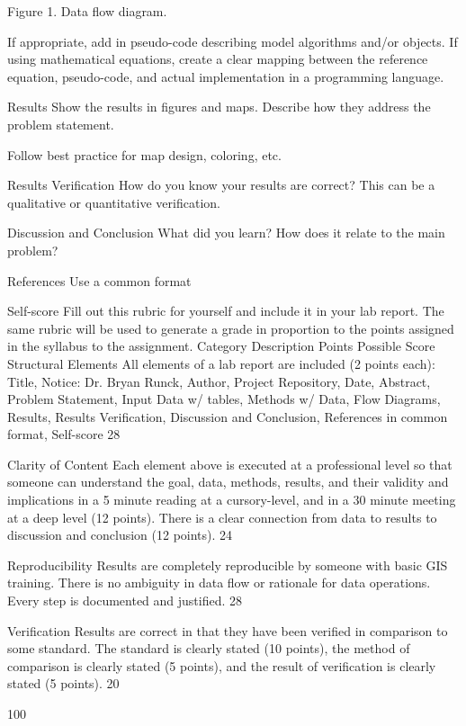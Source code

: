 Figure 1. Data flow diagram. 

If appropriate, add in pseudo-code describing model algorithms and/or objects. If using mathematical equations, create a clear mapping between the reference equation, pseudo-code, and actual implementation in a programming language.

Results
Show the results in figures and maps. Describe how they address the problem statement. 

Follow best practice for map design, coloring, etc.




Results Verification
How do you know your results are correct? This can be a qualitative or quantitative verification.



Discussion and Conclusion
What did you learn? How does it relate to the main problem?




References
Use a common format


Self-score
Fill out this rubric for yourself and include it in your lab report. The same rubric will be used to generate a grade in proportion to the points assigned in the syllabus to the assignment.
Category
Description
Points Possible
Score
Structural Elements
All elements of a lab report are included (2 points each): 
Title, Notice: Dr. Bryan Runck, Author, Project Repository, Date, Abstract, Problem Statement, Input Data w/ tables, Methods w/ Data, Flow Diagrams, Results, Results Verification, Discussion and Conclusion, References in common format, Self-score
28

Clarity of Content
Each element above is executed at a professional level so that someone can understand the goal, data, methods, results, and their validity and implications in a 5 minute reading at a cursory-level, and in a 30 minute meeting at a deep level (12 points). There is a clear connection from data to results to discussion and conclusion (12 points).
24

Reproducibility
Results are completely reproducible by someone with basic GIS training. There is no ambiguity in data flow or rationale for data operations. Every step is documented and justified.
28

Verification
Results are correct in that they have been verified in comparison to some standard. The standard is clearly stated (10 points), the method of comparison is clearly stated (5 points), and the result of verification is clearly stated (5 points).
20



100

